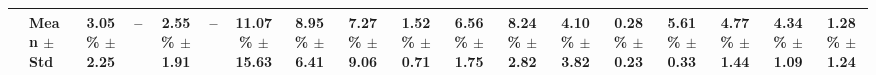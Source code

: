 \begin{table}[t]
{\begin{tabular}{ll*{16}{c}}
\midrule
 & \textbf{Mean $\pm$ Std} & 3.05\% $\pm$ 2.25 & -- & 2.55\% $\pm$ 1.91 & -- & 11.07\% $\pm$ 15.63 & 8.95\% $\pm$ 6.41 & 7.27\% $\pm$ 9.06 & 1.52\% $\pm$ 0.71 & 6.56\% $\pm$ 1.75 & 8.24\% $\pm$ 2.82 & 4.10\% $\pm$ 3.82 & 0.28\% $\pm$ 0.23 & 5.61\% $\pm$ 0.33 & 4.77\% $\pm$ 1.44 & 4.34\% $\pm$ 1.09 & 1.28\% $\pm$ 1.24 \\
\bottomrule
\end{tabular}
}
\end{table}
